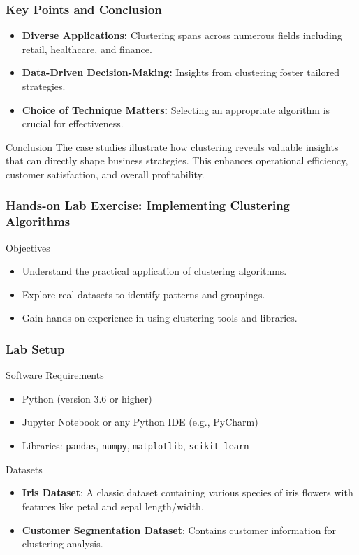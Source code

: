 \documentclass[aspectratio=169]{beamer}
\begin{document}
\begin{frame}[fragile]
    \frametitle{Key Points and Conclusion}
    \begin{itemize}
        \item \textbf{Diverse Applications:} Clustering spans across numerous fields including retail, healthcare, and finance.
        \item \textbf{Data-Driven Decision-Making:} Insights from clustering foster tailored strategies.
        \item \textbf{Choice of Technique Matters:} Selecting an appropriate algorithm is crucial for effectiveness.
    \end{itemize}
    \begin{block}{Conclusion}
        The case studies illustrate how clustering reveals valuable insights that can directly shape business strategies. 
        This enhances operational efficiency, customer satisfaction, and overall profitability.
    \end{block}
\end{frame}

\begin{frame}[fragile]
    \frametitle{Hands-on Lab Exercise: Implementing Clustering Algorithms}
    \begin{block}{Objectives}
        \begin{itemize}
            \item Understand the practical application of clustering algorithms.
            \item Explore real datasets to identify patterns and groupings.
            \item Gain hands-on experience in using clustering tools and libraries.
        \end{itemize}
    \end{block}
\end{frame}

\begin{frame}[fragile]
    \frametitle{Lab Setup}
    \begin{block}{Software Requirements}
        \begin{itemize}
            \item Python (version 3.6 or higher)
            \item Jupyter Notebook or any Python IDE (e.g., PyCharm)
            \item Libraries: \texttt{pandas}, \texttt{numpy}, \texttt{matplotlib}, \texttt{scikit-learn}
        \end{itemize}
    \end{block}

    \begin{block}{Datasets}
        \begin{itemize}
            \item \textbf{Iris Dataset}: A classic dataset containing various species of iris flowers with features like petal and sepal length/width.
            \item \textbf{Customer Segmentation Dataset}: Contains customer information for clustering analysis.
        \end{itemize}
    \end{block}
\end{frame}
\end{document}
